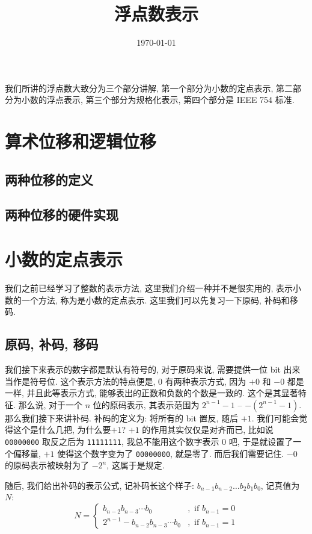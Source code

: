 \documentclass[12pt]{ctexart}
\theoremstyle{definition}
\theoremstyle{plain}
\begin{document}
\title{浮点数表示}
\date{\today}

\maketitle

\tableofcontents

我们所讲的浮点数大致分为三个部分讲解, 第一个部分为小数的定点表示, 第二部分为小数的浮点表示, 第三个部分为规格化表示, 第四个部分是 IEEE 754 标准. 
\section{算术位移和逻辑位移}
\subsection{两种位移的定义}
\subsection{两种位移的硬件实现}
\section{小数的定点表示}
我们之前已经学习了整数的表示方法, 这里我们介绍一种并不是很实用的, 表示小数的一个方法, 称为是小数的定点表示. 这里我们可以先复习一下原码, 补码和移码. 
\subsection{原码, 补码, 移码}
我们接下来表示的数字都是默认有符号的, 对于原码来说, 需要提供一位 bit 出来当作是符号位. 这个表示方法的特点便是, \(0\) 有两种表示方式, 因为 \(+0\) 和 \(-0\) 都是一样, 并且此等表示方式, 能够表出的正数和负数的个数是一致的. 这个是其显著特征. 
那么说, 对于一个 \(n\) 位的原码表示, 其表示范围为 \(2^{n-1} - 1\) -- \(-(2 ^{n-1} - 1)\). 那么我们接下来讲补码.
补码的定义为: 将所有的 bit 置反, 随后 \(+1\). 我们可能会觉得这个是什么几把, 为什么要\(+1\)? \(+1\) 的作用其实仅仅是对齐而已, 比如说 \texttt{00000000} 取反之后为 \texttt{11111111}, 我总不能用这个数字表示 \(0\) 吧, 于是就设置了一个偏移量, \(+1\) 使得这个数字变为了 \texttt{00000000}, 就是零了. 而后我们需要记住. \(-0\) 的原码表示被映射为了 \(-2 ^{n}\), 这属于是规定. 

随后, 我们给出补码的表示公式, 记补码长这个样子: \(b_{n-1}b_{n-2}\dots b_{2}b_{1}b_{0}\), 记真值为 \(N\): 
\begin{equation}
N = 
\begin{cases}
b_{n-2}b_{n-3}\cdots b_{0} &, \text{ if } b_{n-1} = 0\\
2 ^{n-1} - b _{n-2} b_{n-3} \cdots b_{0} &, \text{ if } b_{n-1} = 1
\end{cases}
\end{equation}
\end{document}

